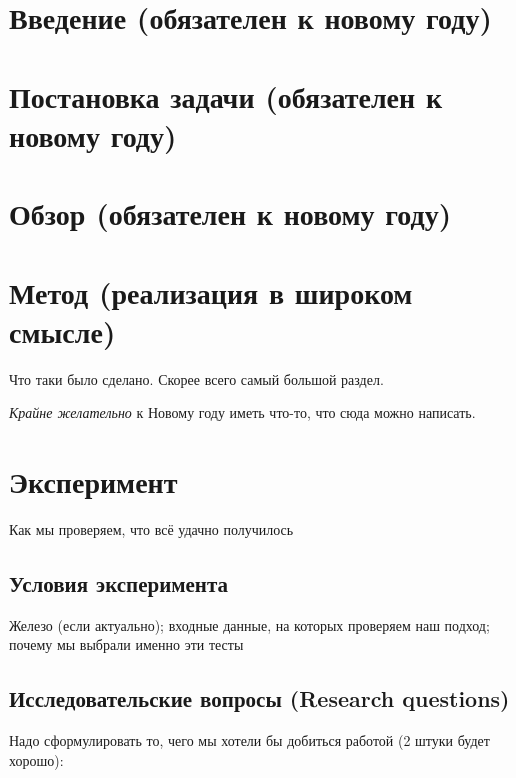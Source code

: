 



\maketitle
\setcounter{tocdepth}{2}
\tableofcontents


\section{Введение (обязателен к новому году)}


\section{Постановка задачи (обязателен к новому году)}
\label{sec:task}


\section{Обзор (обязателен к новому году)}


\section{Метод (реализация в широком смысле)}
Что таки было сделано. Скорее всего самый большой раздел.

\emph{Крайне желательно} к Новому году иметь что-то, что сюда можно написать.

\section{Эксперимент}
Как мы проверяем, что  всё удачно получилось

\subsection{Условия эксперимента}
Железо (если актуально); входные данные, на которых проверяем наш подход; почему мы выбрали именно эти тесты

\subsection{Исследовательские вопросы (Research questions)}
Надо сформулировать то, чего мы хотели бы добиться работой (2 штуки будет хорошо):

